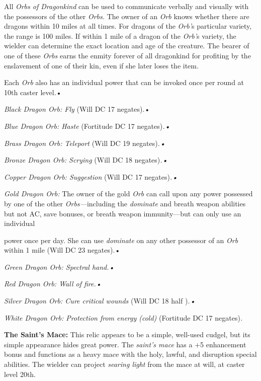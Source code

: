 \documentclass{article}
\begin{document}
All \textit{Orbs of Dragonkind }can be used to communicate verbally and visually 
with the possessors of the other \textit{Orbs. }The owner of an \textit{Orb }knows 
whether there are dragons within 10 miles at all times. For dragons of the \textit{Orb'}s 
particular variety, the range is 100 miles. If within 1 mile of a dragon of the 
\textit{Orb'}s variety, the wielder can determine the exact location and age of 
the creature. The bearer of one of these \textit{Orbs }earns the enmity forever 
of all dragonkind for profiting by the enslavement of one of their kin, even if 
she later loses the item. 

Each \textit{Orb }also has an individual power that can be invoked once per round 
at 10th caster level.• 

\textit{Black Dragon Orb: Fly }(Will DC 17 negates).• 

\textit{Blue Dragon Orb: Haste }(Fortitude DC 17 negates)\textit{.• }

\textit{Brass Dragon Orb: Teleport }(Will DC 19 negates)\textit{.• }

\textit{Bronze Dragon Orb: Scrying }(Will DC 18 negates)\textit{.• }

\textit{Copper Dragon Orb: Suggestion }(Will DC 17 negates)\textit{.• }

\textit{Gold Dragon Orb: }The owner of the gold \textit{Orb }can call upon any 
power possessed by one of the other \textit{Orbs---}including the \textit{dominate 
}and breath weapon abilities but not AC, save bonuses, or breath weapon immunity---but 
can only use an individual

power once per day. She can use \textit{dominate }on any other possessor of an 
\textit{Orb }within 1 mile (Will DC 23 negates).• 

\textit{Green Dragon Orb: Spectral hand.• }

\textit{Red Dragon Orb: Wall of fire.• }

\textit{Silver Dragon Orb: Cure critical wounds }(Will DC 18 half )\textit{.• 
}

\textit{White Dragon Orb: Protection from energy (cold) }(Fortitude DC 17 negates)\textit{.}

\vspace{12pt}
\textbf{The Saint's Mace: }This relic appears to be a simple, well-used cudgel, 
but its simple appearance hides great power. The \textit{saint's mace }has a +5 
enhancement bonus and functions as a heavy mace with the holy, lawful, and disruption 
special abilities. The wielder can project \textit{searing light }from the mace 
at will, at caster level 20th.
\end{document}
